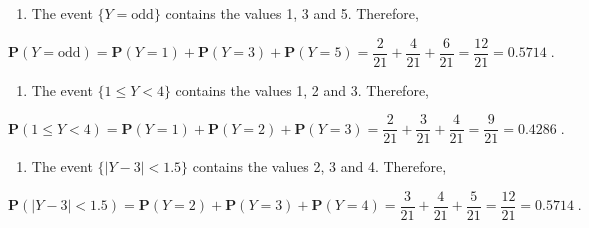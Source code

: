 \documentclass[]{krantz}
\providecommand{\tightlist}{%
  \setlength{\itemsep}{0pt}\setlength{\parskip}{0pt}}
\newcommand{\Prob}{\mathbf{P}}
\theoremstyle{definition}
\theoremstyle{definition}
\theoremstyle{definition}
\theoremstyle{remark}
\begin{document}
\begin{enumerate}
\def\labelenumi{\arabic{enumi}.}
\setcounter{enumi}{2}
\tightlist
\item
  The event \(\{Y = \mbox{odd}\}\)
  contains the values 1, 3 and 5. Therefore,
\end{enumerate}

\[\Prob(Y = \mbox{odd}) = \Prob(Y=1) + \Prob(Y=3) + \Prob(Y=5) = \frac{2}{21} + \frac{4}{21} + \frac{6}{21} = \frac{12}{21}= 0.5714\;.\]

\begin{enumerate}
\def\labelenumi{\arabic{enumi}.}
\setcounter{enumi}{3}
\tightlist
\item
  The event \(\{1 \leq Y < 4\}\)
  contains the values 1, 2 and 3. Therefore,
\end{enumerate}

\[\Prob(1 \leq Y < 4) = \Prob(Y=1) + \Prob(Y=2) + \Prob(Y=3) = \frac{2}{21} + \frac{3}{21} + \frac{4}{21} = \frac{9}{21}= 0.4286\;.\]

\begin{enumerate}
\def\labelenumi{\arabic{enumi}.}
\setcounter{enumi}{4}
\tightlist
\item
  The event \(\{|Y -3| < 1.5\}\)
  contains the values 2, 3 and 4. Therefore,
\end{enumerate}

\[\Prob(|Y -3| < 1.5) = \Prob(Y=2) + \Prob(Y=3) + \Prob(Y=4) = \frac{3}{21} + \frac{4}{21} + \frac{5}{21} = \frac{12}{21}= 0.5714\;.\]
\end{document}
